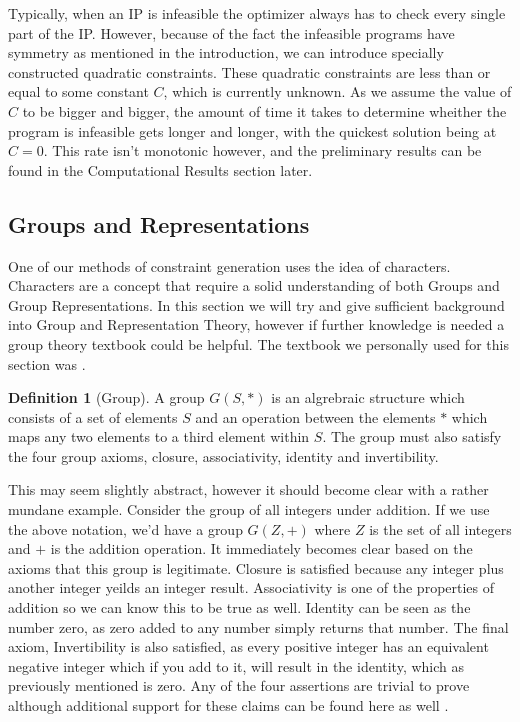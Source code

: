 \documentclass[11pt]{article} %
\theoremstyle{definition}
\newtheorem{definition}[theorem]{Definition}
\theoremstyle{remark}
\begin{document}
Typically, when an IP is infeasible the optimizer always has to check every single part of the IP. However, because of the fact the infeasible programs have symmetry as mentioned in the introduction, we can introduce specially constructed quadratic constraints. These quadratic constraints are less than or equal to some constant $C$, which is currently unknown. As we assume the value of $C$ to be bigger and bigger, the amount of time it takes to determine wheither the program is infeasible gets longer and longer, with the quickest solution being at $C = 0$. This rate isn't monotonic however, and the preliminary results can be found in the Computational Results section later.

\subsection{Groups and Representations}
One of our methods of constraint generation uses the idea of characters. Characters are a concept that require a solid understanding of both Groups and Group Representations. In this section we will try and give sufficient background into Group and Representation Theory, however if further knowledge is needed a group theory textbook could be helpful. The textbook we personally used for this section was \cite{some}.

\begin{definition} [Group]
A group $G(S,*)$ is an algrebraic structure which consists of a set of elements $S$ and an operation between the elements $*$ which maps any two elements to a third element within $S$. The group must also satisfy the four group axioms, closure, associativity, identity and invertibility.
\end{definition}

This may seem slightly abstract, however it should become clear with a rather mundane example. Consider the group of all integers under addition. If we use the above notation, we'd have a group $G(Z, +)$ where $Z$ is the set of all integers and $+$ is the addition operation. It immediately becomes clear based on the axioms that this group is legitimate. Closure is satisfied because any integer plus another integer yeilds an integer result. Associativity is one of the properties of addition so we can know this to be true as well. Identity can be seen as the number zero, as zero added to any number simply returns that number. The final axiom, Invertibility is also satisfied, as every positive integer has an equivalent negative integer which if you add to it, will result in the identity, which as previously mentioned is zero. Any of the four assertions are trivial to prove although additional support for these claims can be found here as well \cite{some}. 
\end{document}

